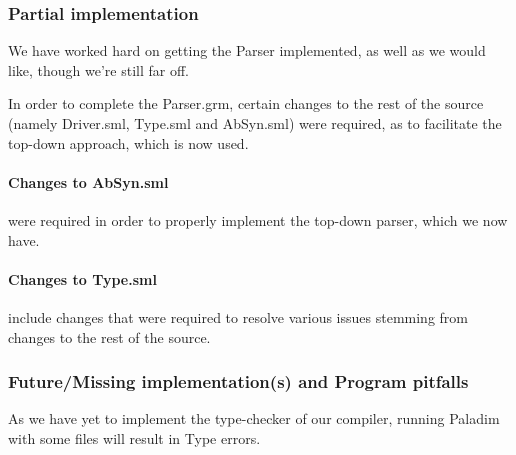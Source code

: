 \subsubsection{Partial implementation}
We have worked hard on getting the Parser implemented, as well as we would like,
though we're still far off.

In order to complete the Parser.grm, certain changes to the rest of the source
(namely Driver.sml, Type.sml and AbSyn.sml) were required, as to facilitate
the top-down approach, which is now used.


\paragraph{Changes to AbSyn.sml} were required in order to properly implement
the top-down parser, which we now have.

\paragraph{Changes to Type.sml} include changes that were required to resolve
various issues stemming from changes to the rest of the source.

\subsubsection{Future/Missing implementation(s) and Program pitfalls}
As we have yet to implement the type-checker of our compiler, running Paladim
with some files will result in Type errors.

